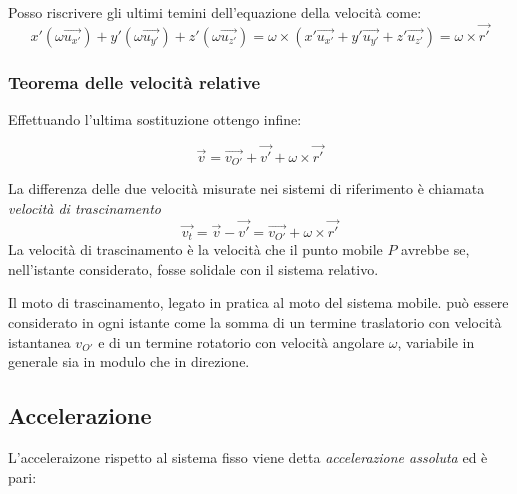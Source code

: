 \documentclass[class=book, crop=false, oneside, 12pt]{standalone}
\begin{document}
Posso riscrivere gli ultimi temini dell'equazione della velocità come:
\begin{equation}
    x' (\omega \overrightarrow{u_{x'}}) + y' (\omega \overrightarrow{u_{y'}}) + z' (\omega \overrightarrow{u_{z'}}) = \omega \times (x' \overrightarrow{u_{x'}} + y' \overrightarrow{u_{y'}} + z' \overrightarrow{u_{z'}}) = \omega \times \overrightarrow{r'}
\end{equation}

\subsubsection{Teorema delle velocità relative}
Effettuando l'ultima sostituzione ottengo infine:

\begin{equation}
    \overrightarrow{v} = \overrightarrow{v_{O'}} + \overrightarrow{v'} + \omega \times \overrightarrow{r'}
\end{equation}

La differenza delle due velocità misurate nei sistemi di riferimento è chiamata \emph{velocità di trascinamento}
\begin{equation*}
    \overrightarrow{v_t} = \overrightarrow{v} - \overrightarrow{v'} = \overrightarrow{v_{O'}} + \omega \times \overrightarrow{r'}
\end{equation*}
La velocità di trascinamento è la velocità che il punto mobile \(P\) avrebbe se, nell’istante considerato, fosse solidale con il sistema relativo.

Il moto di trascinamento, legato in pratica al moto del sistema mobile. può essere considerato in ogni istante come la somma di un termine traslatorio con velocità istantanea \(v_{O'}\) e di un termine rotatorio con velocità angolare \(\omega\), variabile in generale sia in modulo che in direzione.

\subsection{Accelerazione}

L'acceleraizone rispetto al sistema fisso viene detta \emph{accelerazione assoluta} ed è pari:
\end{document}
